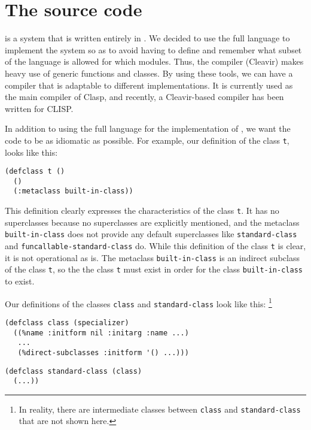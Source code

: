 \section{The \sicl{} source code}

\sicl{} is a system that is written entirely in \commonlisp{}.  We
decided to use the full language to implement the system so as to
avoid having to define and remember what subset of the language is
allowed for which modules.  Thus, the compiler (Cleavir) makes heavy
use of generic functions and classes.  By using these tools, we can
have a compiler that is adaptable to different \commonlisp{}
implementations.  It is currently used as the main compiler of Clasp,
and recently, a Cleavir-based compiler has been written for CLISP.

In addition to using the full language for the implementation of
\sicl{}, we want the code to be as idiomatic as possible.  For
example, our definition of the class \texttt{t}, looks like this:

\begin{verbatim}
(defclass t ()
  ()
  (:metaclass built-in-class))
\end{verbatim}

\noindent
This definition clearly expresses the characteristics of the class
\texttt{t}.  It has no superclasses because no superclasses are
explicitly mentioned, and the metaclass \texttt{built-in-class} does
not provide any default superclasses like \texttt{standard-class} and
\texttt{funcallable-standard-class} do.  While this definition of the
class \texttt{t} is clear, it is not operational as is.  The
metaclass \texttt{built-in-class} is an indirect subclass of the class
\texttt{t}, so the the class \texttt{t} must exist in order for the
class \texttt{built-in-class} to exist.

Our definitions of the classes \texttt{class} and
\texttt{standard-class} look like this:%
\footnote{In reality, there are intermediate classes between
  \texttt{class} and \texttt{standard-class} that are not shown here.}

\begin{verbatim}
(defclass class (specializer)
  ((%name :initform nil :initarg :name ...)
   ...
   (%direct-subclasses :initform '() ...)))
\end{verbatim}

\begin{verbatim}
(defclass standard-class (class)
  (...))
\end{verbatim}

